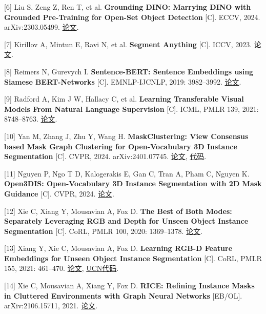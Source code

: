 \documentclass[UTF8,fontset=fandol]{ctexart}
\begin{document}
[6] Liu S, Zeng Z, Ren T, et al. \textbf{Grounding DINO: Marrying DINO with Grounded Pre-Training for Open-Set Object Detection} [C]. ECCV, 2024. arXiv:2303.05499. \href{https://arxiv.org/abs/2303.05499}{论文}.



[7] Kirillov A, Mintun E, Ravi N, et al. \textbf{Segment Anything} [C]. ICCV, 2023. \href{https://arxiv.org/abs/2304.02643}{论文}.



[8] Reimers N, Gurevych I. \textbf{Sentence-BERT: Sentence Embeddings using Siamese BERT-Networks} [C]. EMNLP-IJCNLP, 2019: 3982–3992. \href{https://aclanthology.org/D19-1410/}{论文}.



[9] Radford A, Kim J W, Hallacy C, et al. \textbf{Learning Transferable Visual Models From Natural Language Supervision} [C]. ICML, PMLR 139, 2021: 8748–8763. \href{https://proceedings.mlr.press/v139/radford21a.html}{论文}.



[10] Yan M, Zhang J, Zhu Y, Wang H. \textbf{MaskClustering: View Consensus based Mask Graph Clustering for Open-Vocabulary 3D Instance Segmentation} [C]. CVPR, 2024. arXiv:2401.07745. \href{https://arxiv.org/abs/2401.07745}{论文}, \href{https://github.com/PKU-EPIC/MaskClustering}{代码}.



[11] Nguyen P, Ngo T D, Kalogerakis E, Gan C, Tran A, Pham C, Nguyen K. \textbf{Open3DIS: Open-Vocabulary 3D Instance Segmentation with 2D Mask Guidance} [C]. CVPR, 2024. \href{https://openaccess.thecvf.com/content/CVPR2024/papers/Nguyen\_Open3DIS\_Open-Vocabulary\_3D\_Instance\_Segmentation\_with\_2D\_Mask\_Guidance\_CVPR\_2024\_paper.pdf}{论文}.



[12] Xie C, Xiang Y, Mousavian A, Fox D. \textbf{The Best of Both Modes: Separately Leveraging RGB and Depth for Unseen Object Instance Segmentation} [C]. CoRL, PMLR 100, 2020: 1369–1378. \href{https://proceedings.mlr.press/v100/xie20b.html}{论文}.



[13] Xiang Y, Xie C, Mousavian A, Fox D. \textbf{Learning RGB-D Feature Embeddings for Unseen Object Instance Segmentation} [C]. CoRL, PMLR 155, 2021: 461–470. \href{https://proceedings.mlr.press/v155/xiang21a.html}{论文}, \href{https://github.com/NVlabs/UnseenObjectClustering}{UCN代码}.



[14] Xie C, Mousavian A, Xiang Y, Fox D. \textbf{RICE: Refining Instance Masks in Cluttered Environments with Graph Neural Networks} [EB/OL]. arXiv:2106.15711, 2021. \href{https://arxiv.org/abs/2106.15711}{论文}.
\end{document}
